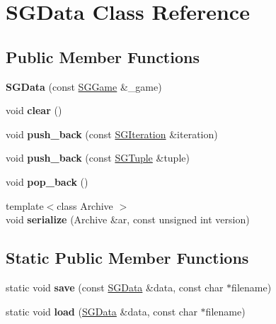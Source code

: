 \hypertarget{class_s_g_data}{\section{S\+G\+Data Class Reference}
\label{class_s_g_data}
}
\subsection*{Public Member Functions}
\begin{DoxyCompactItemize}
\item 
\hypertarget{class_s_g_data_aaa0dab45f91e7da521ae8b8dc80d113d}{{\bfseries S\+G\+Data} (const \hyperlink{class_s_g_game}{S\+G\+Game} \&\+\_\+game)}\label{class_s_g_data_aaa0dab45f91e7da521ae8b8dc80d113d}

\item 
\hypertarget{class_s_g_data_a88d87798514fa3b3470442976db2afff}{void {\bfseries clear} ()}\label{class_s_g_data_a88d87798514fa3b3470442976db2afff}

\item 
\hypertarget{class_s_g_data_ac2162c25f0aebe80783efe0b5349032e}{void {\bfseries push\+\_\+back} (const \hyperlink{class_s_g_iteration}{S\+G\+Iteration} \&iteration)}\label{class_s_g_data_ac2162c25f0aebe80783efe0b5349032e}

\item 
\hypertarget{class_s_g_data_afe988c0a8dd7c71a9dd61fccfe5b3876}{void {\bfseries push\+\_\+back} (const \hyperlink{class_s_g_tuple}{S\+G\+Tuple} \&tuple)}\label{class_s_g_data_afe988c0a8dd7c71a9dd61fccfe5b3876}

\item 
\hypertarget{class_s_g_data_aea26fef4cbbb2a706cfb0c871fb804a5}{void {\bfseries pop\+\_\+back} ()}\label{class_s_g_data_aea26fef4cbbb2a706cfb0c871fb804a5}

\item 
\hypertarget{class_s_g_data_a4aa12a968f317f0b89f54d65af1e86ab}{{\footnotesize template$<$class Archive $>$ }\\void {\bfseries serialize} (Archive \&ar, const unsigned int version)}\label{class_s_g_data_a4aa12a968f317f0b89f54d65af1e86ab}

\end{DoxyCompactItemize}
\subsection*{Static Public Member Functions}
\begin{DoxyCompactItemize}
\item 
\hypertarget{class_s_g_data_a01f1e49d025ffed33549ef26b05a1d8a}{static void {\bfseries save} (const \hyperlink{class_s_g_data}{S\+G\+Data} \&data, const char $\ast$filename)}\label{class_s_g_data_a01f1e49d025ffed33549ef26b05a1d8a}

\item 
\hypertarget{class_s_g_data_adf23a971f4e96fd72a54fbc6688b2b04}{static void {\bfseries load} (\hyperlink{class_s_g_data}{S\+G\+Data} \&data, const char $\ast$filename)}\label{class_s_g_data_adf23a971f4e96fd72a54fbc6688b2b04}

\end{DoxyCompactItemize}
